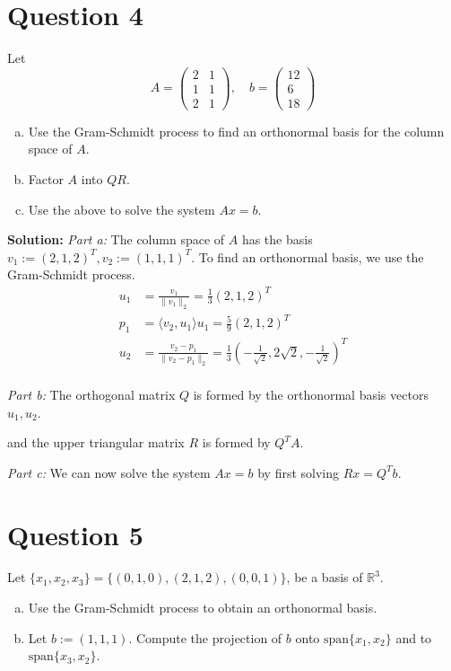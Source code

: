 \documentclass{article}
\begin{document}
\newpage
\section*{Question 4}
Let 
$$ A = \begin{pmatrix} 2 & 1 \\ 1 & 1 \\ 2 & 1 \end{pmatrix}, \quad
   b = \begin{pmatrix} 12 \\ 6 \\ 18 \end{pmatrix} $$
\begin{enumerate}[a.]
    \item Use the Gram-Schmidt process to find an orthonormal basis for the column space of $A$.
    \item Factor $A$ into $QR$.
    \item Use the above to solve the system $Ax = b$.
\end{enumerate}

\vspace{0.25cm}\noindent\textbf{Solution:}
\newline\noindent\textit{Part a:}
The column space of $A$ has the basis $v_1 := (2, 1, 2)^T, v_2 := (1, 1, 1)^T$.
To find an orthonormal basis, we use the Gram-Schmidt process.
\begin{align*}
    u_1 &= \frac{v_1}{\|v_1\|_2} = \frac{1}{3} (2, 1, 2)^T \\
    p_1 &= \langle v_2, u_1 \rangle u_1 = \frac{5}{9} (2, 1, 2)^T \\
    u_2 &= \frac{v_2 - p_1}{\|v_2 - p_1\|_2} = \frac{1}{3} (-\frac{1}{\sqrt{2}}, 2 \sqrt{2}, -\frac{1}{\sqrt{2}})^T \\
\end{align*}

\noindent\textit{Part b:}
The orthogonal matrix $Q$ is formed by the orthonormal basis vectors $u_1, u_2$.

\noindent and the upper triangular matrix $R$ is formed by $Q^T A$.


\noindent\textit{Part c:}
We can now solve the system $Ax = b$ by first solving $Rx = Q^T b$.


\section*{Question 5}
Let $\{x_1, x_2, x_3\} = \{(0, 1, 0), (2, 1, 2), (0, 0, 1)\}$, be a basis of $\mathbb{R}^3$.
\begin{enumerate}[a.]
    \item Use the Gram-Schmidt process to obtain an orthonormal basis.
    \item Let $ b := (1, 1, 1) $. Compute the projection of $ b $ onto $\text{span}\{x_1, x_2\}$ and to $\text{span}\{x_3, x_2\}$.
\end{enumerate}
\end{document}
